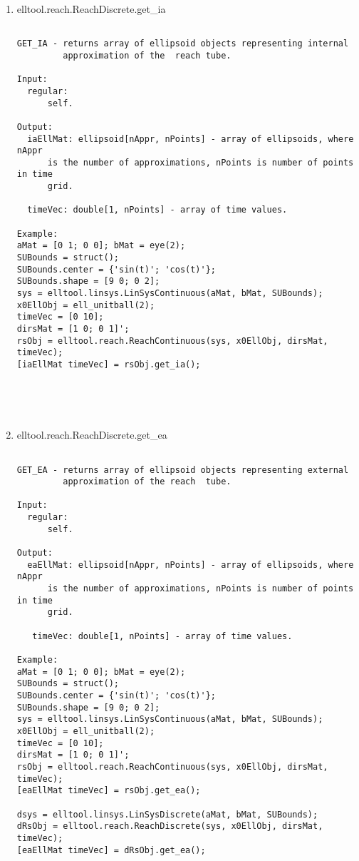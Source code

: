 \begin{enumerate}
\begin{lstlisting}
\end{lstlisting}
\fontfamily{\familydefault}
\selectfont
\item {elltool.reach.ReachDiscrete.get\_ia}
\selectfont
\begin{lstlisting}

GET_IA - returns array of ellipsoid objects representing internal
         approximation of the  reach tube.

Input:
  regular:
      self.

Output:
  iaEllMat: ellipsoid[nAppr, nPoints] - array of ellipsoids, where nAppr
      is the number of approximations, nPoints is number of points in time
      grid.

  timeVec: double[1, nPoints] - array of time values.

Example:
aMat = [0 1; 0 0]; bMat = eye(2);
SUBounds = struct();
SUBounds.center = {'sin(t)'; 'cos(t)'};
SUBounds.shape = [9 0; 0 2];
sys = elltool.linsys.LinSysContinuous(aMat, bMat, SUBounds);
x0EllObj = ell_unitball(2);
timeVec = [0 10];
dirsMat = [1 0; 0 1]';
rsObj = elltool.reach.ReachContinuous(sys, x0EllObj, dirsMat, timeVec);
[iaEllMat timeVec] = rsObj.get_ia();





\end{lstlisting}
\fontfamily{\familydefault}
\selectfont
\item {elltool.reach.ReachDiscrete.get\_ea}
\selectfont
\begin{lstlisting}

GET_EA - returns array of ellipsoid objects representing external
         approximation of the reach  tube.

Input:
  regular:
      self.

Output:
  eaEllMat: ellipsoid[nAppr, nPoints] - array of ellipsoids, where nAppr
      is the number of approximations, nPoints is number of points in time
      grid.

   timeVec: double[1, nPoints] - array of time values.

Example:
aMat = [0 1; 0 0]; bMat = eye(2);
SUBounds = struct();
SUBounds.center = {'sin(t)'; 'cos(t)'};
SUBounds.shape = [9 0; 0 2];
sys = elltool.linsys.LinSysContinuous(aMat, bMat, SUBounds);
x0EllObj = ell_unitball(2);
timeVec = [0 10];
dirsMat = [1 0; 0 1]';
rsObj = elltool.reach.ReachContinuous(sys, x0EllObj, dirsMat, timeVec);
[eaEllMat timeVec] = rsObj.get_ea();

dsys = elltool.linsys.LinSysDiscrete(aMat, bMat, SUBounds);
dRsObj = elltool.reach.ReachDiscrete(sys, x0EllObj, dirsMat, timeVec);
[eaEllMat timeVec] = dRsObj.get_ea();






\end{lstlisting}
\end{enumerate}
